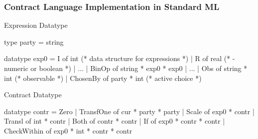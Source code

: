 \documentclass[xcolor=dvipsnames,11pt]{beamer}
\renewcommand{\emph}[1]{\textcolor{structure!90}{#1}}
\begin{document}
\begin{frame}[fragile,t]
    \frametitle{Contract Language Implementation in Standard ML}
\emph{Expression Datatype}
\begin{mlcode}
type party = string
                       
datatype exp0 = I of int  (* data structure for expressions *)
              | R of real (*  - numeric or boolean *)
              | ...
              | BinOp of string * exp0 * exp0
              | ...
              | Obs of string * int     (* observable *)
              | ChosenBy of party * int (* active choice *)
\end{mlcode}

\emph{Contract Datatype}
\begin{mlcode}
datatype contr =
       Zero
     | TransfOne of cur * party * party
     | Scale of exp0 * contr
     | Transl of int * contr
     | Both of contr * contr
     | If of exp0 * contr * contr
     | CheckWithin of exp0 * int * contr * contr
\end{mlcode}
%
\end{frame}
\end{document}
